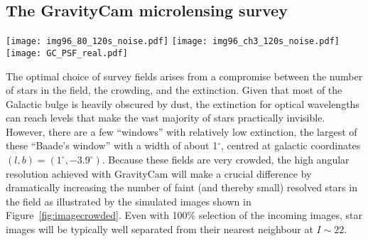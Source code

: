 \documentclass{pasa}%
\newcommand\arcsec{\hbox{$^{\prime\prime}$}}
\begin{document}
\subsection{The GravityCam microlensing survey}
\label{Sec:MicroLensingSurvey}

\begin{figure*}
\begin{center}
\texttt{[image: img96\_80\_120s\_noise.pdf]}
\texttt{[image: img96\_ch3\_120s\_noise.pdf]}
\hspace*{0.3cm}
\texttt{[image: GC\_PSF\_real.pdf]}
\end{center}
\caption{Simulated ESO NTT images of about $7\arcsec \times 7\arcsec$ size for 2~min exposures, showing the improvement resulting from \mbox{GravityCam} as compared to being limited by an average $0.8\arcsec$~FWHM, where the core-halo point spread function for 100\% frame selection shown on the right has been adopted, with GravityCam giving $0.07\arcsec$/pixel. }
\label{fig:imagecrowded}
\end{figure*}

The optimal choice of survey fields arises from a compromise between the number of stars in the field, the crowding, and the extinction. Given that most of the Galactic bulge is heavily obscured by dust, the extinction for optical wavelengths can reach levels that make the vast majority of stars practically invisible. However, there are a few ``windows'' with relatively low extinction, the largest of these ``Baade's window'' with a width of about 1$^\circ$, centred at galactic coordinates $(l,b) = (1^\circ,-3.9^\circ)$. Because these fields are very crowded, the high angular resolution achieved with \mbox{GravityCam} will make a crucial difference by dramatically increasing the number of faint (and thereby small) resolved stars in the field as illustrated by the simulated images shown in Figure~\ref{fig:imagecrowded}. Even with 100\% selection of the incoming images, star images will be typically well separated from their nearest neighbour at $I \sim 22$. 


\begin{figure*}
\centering
\begin{minipage}{\columnwidth}
\centering
{}
\end{minipage}
\hfill
\begin{minipage}{\columnwidth}
\centering
{}
\end{minipage}
\caption{({\em left}) Model light curve and data acquired with 6 different telescopes of microlensing event OGLE-2005-BLG-390, showing the small blip that revealed planet OGLE-2005-BLG-390Lb \citep{Bea+2006} with about 5~Earth masses. An Earth-mass planet in the same spot would have led to a 3\% deviation. ({\em right})  Signature of planet OGLE-2005-BLG-390Lb with $m_\mathrm{p} = 5.5~M_\oplus$  and a source star with $R = 9.6~R_\odot$ (black), together with those for an Earth-mass planet in the same spot (blue), and a Lunar-mass body with a Sun-like star (red). Even the latter would be detectable with 2\% photometry and 15~min cadence.}
\label{fig:microsignal}
\end{figure*}
\end{document}

